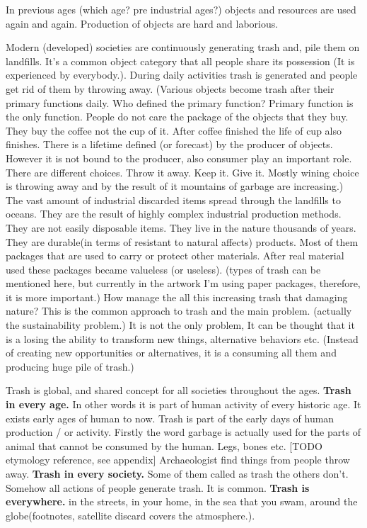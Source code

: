 In previous ages (which age? pre industrial ages?) objects and resources are used again and again. Production of objects are hard and laborious.  

Modern (developed) societies are continuously generating trash and, pile them on landfills. It's a common object category that all people share its possession (It is experienced by everybody.). During daily activities trash is generated and people get rid of them by throwing away. (Various objects become trash after their primary functions daily. Who defined the primary function? Primary function is the only function. People do not care the package of the objects that they buy. They buy the coffee not the cup of it. After coffee finished the life of cup also finishes. There is a lifetime defined (or forecast) by the producer of objects. However it is not bound to the producer, also consumer play an important role. There are different choices. Throw it away. Keep it. Give it. Mostly wining choice is throwing away and by the result of it mountains of garbage are increasing.) The vast amount of industrial discarded items spread through the landfills to oceans. They are the result of highly complex industrial production methods. They are not easily disposable items. They live in the nature thousands of years. They are durable(in terms of resistant to natural affects) products. Most of them packages that are used to carry or protect other materials. After real material used these packages became valueless (or useless). (types of trash can be mentioned here, but currently in the artwork I'm using paper packages, therefore, it is more important.) How manage the all this increasing trash that damaging nature?  This is the common approach to trash and the main problem. (actually the sustainability problem.) It is not the only problem, It can be thought that it is a losing the ability to transform new things, alternative behaviors etc. (Instead of creating new opportunities or alternatives, it is a consuming all them and producing huge pile of trash.) 

Trash is global, and shared concept for all societies throughout the ages. 
\textbf{Trash in every age.} In other words it is part of human activity of every historic age. It exists early ages of human to now. Trash is part of the early days of human production / or activity. Firstly the word garbage is actually used for the parts of animal that cannot be consumed by the human. Legs, bones etc. [TODO etymology reference, see appendix] Archaeologist find things from people throw away. 
\textbf{Trash in every society.} Some of them called as trash the others don't. Somehow all actions of people generate trash. It is common. 
\textbf{Trash is everywhere.} in the streets, in your home, in the sea that you swam, around the globe(footnotes, satellite discard covers the atmosphere.).

